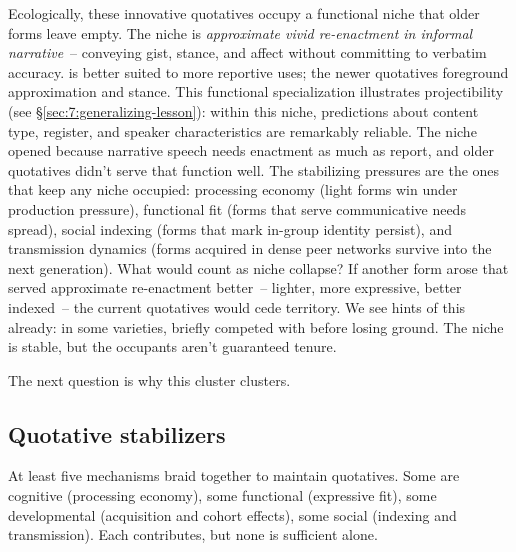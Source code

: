 Ecologically, these innovative quotatives occupy a functional niche that older forms leave empty. The niche is \emph{approximate vivid re-enactment in informal narrative}~-- conveying gist, stance, and affect without committing to verbatim accuracy.  is better suited to more reportive uses; the newer quotatives foreground approximation and stance. This functional specialization illustrates projectibility (see §\ref{sec:7:generalizing-lesson}): within this niche, predictions about content type, register, and speaker characteristics are remarkably reliable. The niche opened because narrative speech needs enactment as much as report, and older quotatives didn't serve that function well. The stabilizing pressures are the ones that keep any niche occupied: processing economy (light forms win under production pressure), functional fit (forms that serve communicative needs spread), social indexing (forms that mark in-group identity persist), and transmission dynamics (forms acquired in dense peer networks survive into the next generation). What would count as niche collapse? If another form arose that served approximate re-enactment better~-- lighter, more expressive, better indexed~-- the current quotatives would cede territory. We see hints of this already: in some varieties,  briefly competed with  before losing ground. The niche is stable, but the occupants aren't guaranteed tenure.

The next question is why this cluster clusters.

\subsection{Quotative stabilizers}
\label{sec:6:quotative-stabilizers}

At least five mechanisms braid together to maintain quotatives. Some are cognitive (processing economy), some functional (expressive fit), some developmental (acquisition and cohort effects), some social (indexing and transmission). Each contributes, but none is sufficient alone.

